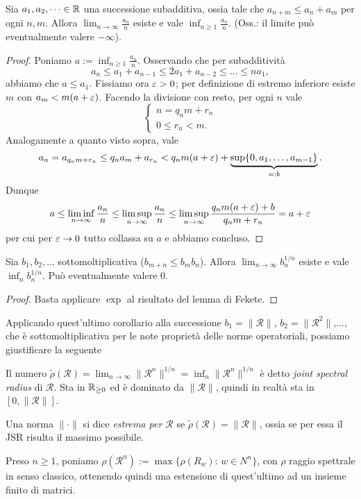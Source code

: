 \begin{lemma}[di Fekete]
	Sia $a_{1},a_{2},\dots \in\mathbb{R}$ una successione subadditiva, ossia tale che $a_{n+m}\leq a_{n}+a_{m}$ per ogni $n,m$. Allora $\lim_{n\to\infty}\frac{a_{n}}{n}$ esiste e vale $\inf_{n\geq1}\frac{a_{n}}{n}$. (Oss.: il limite può eventualmente valere $-\infty$).
\end{lemma}
\begin{proof}
	Poniamo $a := \inf_{n\geq1}\frac{a_{n}}{n}$. Osservando che per subadditività
	$$a_{n}\leq a_{1} + a_{n-1} \leq 2a_{1} + a_{n-2}\leq\dots\leq na_{1},$$
	abbiamo che $a\leq a_{1}$.
	Fissiamo ora $\varepsilon>0$; per definizione di estremo inferiore esiste $m$ con $a_{m}<m(a+\varepsilon)$.
	Facendo la divisione con resto, per ogni $n$ vale 
	$$\begin{cases}
		n = q_{n}m + r_{n}\\
		0\leq r_{n}< m.
	\end{cases}$$
	Analogamente a quanto visto sopra, vale 
	$$a_{n} = a_{q_{n}m +r_{n}} \leq q_{n}a_{m} + a_{r_{n}} < q_{n}m(a+\varepsilon) + \underbrace{\sup\{0,a_{1},\dots, a_{m-1}\}}_{=:b}.$$
	Dunque  
	$$a \leq \liminf_{n\to\infty}\frac{a_{n}}{n} \leq \limsup_{n\to\infty}\frac{a_{n}}{n} \leq \limsup_{n\to\infty}\frac{q_{n}m(a + \varepsilon) + b}{q_{n}m + r_{n}} = a + \varepsilon$$
	per cui per $\varepsilon\to0$ tutto collassa su $a$ e abbiamo concluso.
\end{proof}
\begin{corollario}
	Sia $b_{1},b_{2},\dots$ sottomoltiplicativa ($b_{m+n}\leq b_{m}b_{n}$). Allora $\lim_{n\to\infty}b_{n}^{1/n}$ esiste e vale $\inf_{n} b_{n}^{1/n}$. Può eventualmente valere 0.
\end{corollario}
\begin{proof}
	Basta applicare $\exp$ al risultato del lemma di Fekete. 
\end{proof}

Applicando quest'ultimo corollario alla successione $b_{1} = \|\mathcal R\|$, $b_{2} = \|\mathcal R^{2}\|$,$\dots$, che è sottomoltiplicativa per le note proprietà delle norme operatoriali, possiamo giustificare la seguente 
\begin{definizione}
	Il numero $\tilde\rho(\mathcal R) = \lim_{n\to\infty}\|\mathcal R^{n}\|^{1/n} = \inf_{n}\|\mathcal R^{n}\|^{1/n}$ è detto \emph{joint spectral radius} di $\mathcal R$. Sta in $\mathbb{R}_{\geq0}$ ed è dominato da $\|\mathcal R\|$, quindi in realtà sta in $[0, \|\mathcal R\|]$.
\end{definizione}
\begin{definizione}
	Una norma $\|\cdot\|$ si dice \emph{estrema per $\mathcal R$} se $\tilde\rho(\mathcal R) = \|\mathcal R\|$, ossia se per essa il JSR risulta il massimo possibile.
\end{definizione}
\begin{definizione}
	Preso $n\geq1$, poniamo $\rho(\mathcal R^{n}):=\max\{\rho(R_{w}):\, w\in N^{n}\}$, con $\rho$ raggio spettrale in senso classico, ottenendo quindi una estensione di quest'ultimo ad un insieme finito di matrici.
\end{definizione}

